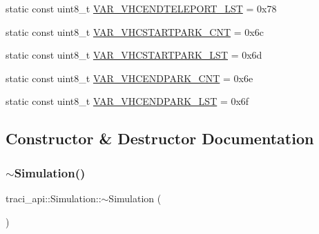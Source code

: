 \begin{DoxyCompactItemize}
\item 
static const uint8\+\_\+t \hyperlink{classtraci__api_1_1_simulation_a7662449bf431cf2c454d192f7b6c6bf8}{V\+A\+R\+\_\+\+V\+H\+C\+E\+N\+D\+T\+E\+L\+E\+P\+O\+R\+T\+\_\+\+L\+ST} = 0x78
\item 
static const uint8\+\_\+t \hyperlink{classtraci__api_1_1_simulation_afb8883f64f8a38cc0fab2ceb5ca19b12}{V\+A\+R\+\_\+\+V\+H\+C\+S\+T\+A\+R\+T\+P\+A\+R\+K\+\_\+\+C\+NT} = 0x6c
\item 
static const uint8\+\_\+t \hyperlink{classtraci__api_1_1_simulation_aa9a559c39436fc08695c37e9939d5ab4}{V\+A\+R\+\_\+\+V\+H\+C\+S\+T\+A\+R\+T\+P\+A\+R\+K\+\_\+\+L\+ST} = 0x6d
\item 
static const uint8\+\_\+t \hyperlink{classtraci__api_1_1_simulation_a6a63c336454d76895435d70b0119d2de}{V\+A\+R\+\_\+\+V\+H\+C\+E\+N\+D\+P\+A\+R\+K\+\_\+\+C\+NT} = 0x6e
\item 
static const uint8\+\_\+t \hyperlink{classtraci__api_1_1_simulation_ac9b1a6baea01106e4c283f9d8a3d40dc}{V\+A\+R\+\_\+\+V\+H\+C\+E\+N\+D\+P\+A\+R\+K\+\_\+\+L\+ST} = 0x6f
\end{DoxyCompactItemize}


\subsection{Constructor \& Destructor Documentation}
\mbox{\label{classtraci__api_1_1_simulation_af0680bb9b12ef4c4d47e45f3aeebc108}} 
\subsubsection{\texorpdfstring{$\sim$\+Simulation()}{~Simulation()}}
{\footnotesize\ttfamily traci\+\_\+api\+::\+Simulation\+::$\sim$\+Simulation (\begin{DoxyParamCaption}{ }\end{DoxyParamCaption})}

\mbox{\label{classtraci__api_1_1_simulation_a0e41f9a2911b8f3545002220027a9922}} 
